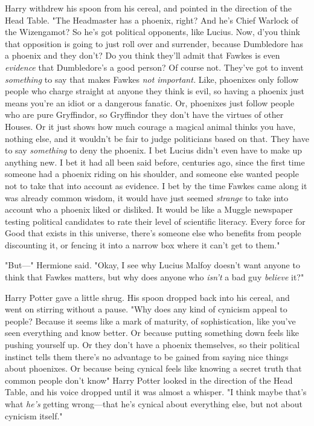 Harry withdrew his spoon from his cereal, and pointed in the direction of the
Head Table. "The Headmaster has a phoenix, right? And he's Chief Warlock of the
Wizengamot? So he's got political opponents, like Lucius. Now, d'you think that
opposition is going to just roll over and surrender, because Dumbledore has a
phoenix and they don't? Do you think they'll admit that Fawkes is even
\emph{evidence} that Dumbledore's a good person? Of course not. They've got to
invent \emph{something} to say that makes Fawkes{\el} \emph{not important.}
Like, phoenixes only follow people who charge straight at anyone they think is
evil, so having a phoenix just means you're an idiot or a dangerous fanatic.
Or, phoenixes just follow people who are pure Gryffindor, so Gryffindor they
don't have the virtues of other Houses. Or it just shows how much courage a
magical animal thinks you have, nothing else, and it wouldn't be fair to judge
politicians based on that. They have to say \emph{something} to deny the
phoenix. I bet Lucius didn't even have to make up anything new. I bet it had
all been said before, centuries ago, since the first time someone had a phoenix
riding on his shoulder, and someone else wanted people not to take that into
account as evidence. I bet by the time Fawkes came along it was already common
wisdom, it would have just seemed \emph{strange} to take into account who a
phoenix liked or disliked. It would be like a Muggle newspaper testing
political candidates to rate their level of scientific literacy. Every force
for Good that exists in this universe, there's someone else who benefits from
people discounting it, or fencing it into a narrow box where it can't get to
them."

"But\mbox{---}" Hermione said. "Okay, I see why Lucius Malfoy doesn't want anyone to
think that Fawkes matters, but why does anyone who \emph{isn't} a bad guy
\emph{believe} it?"

Harry Potter gave a little shrug. His spoon dropped back into his cereal, and
went on stirring without a pause. "Why does any kind of cynicism appeal to
people? Because it seems like a mark of maturity, of sophistication, like
you've seen everything and know better. Or because putting something down feels
like pushing yourself up. Or they don't have a phoenix themselves, so their
political instinct tells them there's no advantage to be gained from saying
nice things about phoenixes. Or because being cynical feels like knowing a
secret truth that common people don't know{\el}" Harry Potter looked in the
direction of the Head Table, and his voice dropped until it was almost a
whisper. "I think maybe that's what \emph{he's} getting wrong---that he's
cynical about everything else, but not about cynicism itself."

